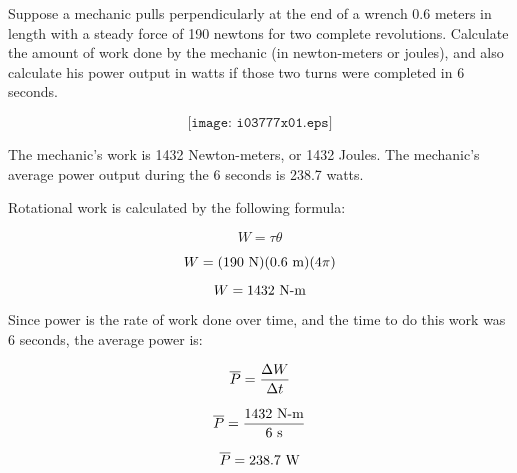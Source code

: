 

Suppose a mechanic pulls perpendicularly at the end of a wrench 0.6 meters in length with a steady force of 190 newtons for two complete revolutions.  Calculate the amount of work done by the mechanic (in newton-meters or joules), and also calculate his power output in watts if those two turns were completed in 6 seconds.

$$\texttt{[image: i03777x01.eps]}$$







The mechanic's work is 1432 Newton-meters, or 1432 Joules.  The mechanic's average power output during the 6 seconds is 238.7 watts.







Rotational work is calculated by the following formula:

$$W = \tau \theta$$

$$W = (190 \hbox{ N})(0.6 \hbox{ m})(4 \pi)$$

$$W = 1432 \hbox{ N-m}$$

\vskip 10pt

Since power is the rate of work done over time, and the time to do this work was 6 seconds, the average power is:

$$\overline{P} = {\Delta W \over \Delta t}$$

$$\overline{P} = {1432 \hbox{ N-m} \over 6 \hbox{ s}}$$

$$\overline{P} = 238.7 \hbox{ W}$$




